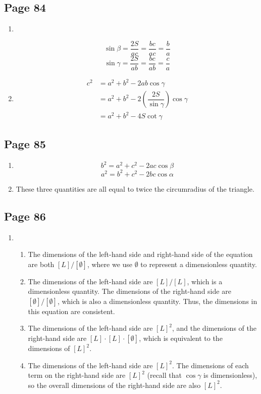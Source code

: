 \documentclass{article}
\newenvironment{solutions}[1]
{\subsection*{#1}
 \begin{enumerate}[leftmargin=1.5em]}
{\end{enumerate}}
\newcommand{\solution}{\item}
\newenvironment{subsolutions}
{\begin{enumerate}}
{\end{enumerate}}
\newcommand{\subsolution}{\item}
\begin{document}
\begin{solutions}{Page 84}
\solution ~ %
\begin{center}
\end{center}

\[
\sin{\beta} = \dfrac{2S}{ac} = \dfrac{bc}{ac} = \dfrac{b}{a}
\]
\[
\sin{\gamma} = \dfrac{2S}{ab} = \dfrac{bc}{ab} = \dfrac{c}{a}
\]
\solution %
\begin{align*}
c^2 &= a^2+b^2 - 2ab\cos{\gamma} \\
&= a^2+b^2 -2 \left(\dfrac{2S}{\sin{\gamma}}\right)\cos{\gamma} \\
&= a^2+b^2 - 4S\cot{\gamma}
\end{align*}
\end{solutions}

\begin{solutions}{Page 85}
\solution %
\[
b^2 = a^2 + c^2 - 2ac\cos{\beta}
\]
\[
a^2 = b^2 + c^2 - 2bc\cos{\alpha}
\]
\solution %
These three quantities are all equal to twice the circumradius of the triangle.
\end{solutions}

\begin{solutions}{Page 86}
\solution %
\begin{subsolutions}
\subsolution %
The dimensions of the left-hand side and right-hand side of the equation are both $[L]/[\emptyset]$, where we use $\emptyset$ to represent a dimensionless quantity.

\subsolution %
The dimensions of the left-hand side are $[L]/[L]$, which is a dimensionless quantity. The dimensions of the right-hand side are $[\emptyset]/[\emptyset]$, which is also a dimensionless quantity. Thus, the dimensions in this equation are consistent.

\subsolution %
The dimensions of the left-hand side are $[L]^2$, and the dimensions of the right-hand side are $[L]\cdot[L]\cdot[\emptyset]$, which is equivalent to the dimensions of $[L]^2$.

\subsolution %
The dimensions of the left-hand side are $[L]^2$. The dimensions of each term on the right-hand side are $[L]^2$ (recall that $\cos{\gamma}$ is dimensionless), so the overall dimensions of the right-hand side are also $[L]^2$.
\end{subsolutions}
\end{solutions}
\end{document}
